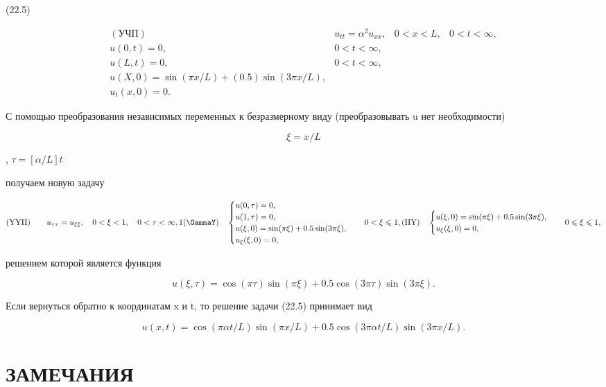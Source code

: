 \documentclass[
  ukrainian,
]{article}
\begin{document}
(22.5)

\[
\begin{array}{llll} (\text{УЧП}) & u_{tt} = \alpha^2 u_{xx}, & 0 < x < L, & 0 < t < \infty, \\ u(0, t) = 0, & 0 < t < \infty, \\ u(L, t) = 0, & 0 < t < \infty, \\ u(X, 0) = \sin(\pi x/L) + (0.5)\sin(3\pi x/L), \\ u_t(x, 0) = 0. & \end{array}
\]

С помощью преобразования независимых переменных к безразмерному виду
(преобразовывать u нет необходимости)

\[
\xi = x/L
\]

, \(\tau = [\alpha/L] t\)

получаем новую задачу

\[
(\text{YYII}) \qquad u_{\tau\tau} = u_{\xi\xi}, \quad 0 < \xi < 1, \quad 0 < \tau < \infty, 1
(\text{\GammaY}) \quad
\begin{cases} u(0, \tau) = 0, \\ u(1, \tau) = 0, \\ u(\xi, 0) = \sin(\pi\xi) + 0.5\sin(3\pi\xi), \\ u_{\xi}(\xi, 0) = 0, \end{cases}
\quad 0 < \xi \leqslant 1,
(\text{HY}) \quad
\begin{cases} u(\xi, 0) = \sin(\pi\xi) + 0.5\sin(3\pi\xi), \\ u_{\xi}(\xi, 0) = 0, \end{cases}
\quad 0 \leqslant \xi \leqslant 1,
\]

решением которой является функция

\[
u(\xi, \tau) = \cos(\pi \tau) \sin(\pi \xi) + 0.5 \cos(3\pi \tau) \sin(3\pi \xi).
\]

Если вернуться обратно к координатам x и t, то решение задачи (22.5)
принимает вид

\[
u(x, t) = \cos(\pi \alpha t/L)\sin(\pi x/L) + 0.5\cos(3\pi \alpha t/L)\sin(3\pi x/L).
\]

\section{ЗАМЕЧАНИЯ}\label{ux437ux430ux43cux435ux447ux430ux43dux438ux44f-8}
\end{document}
